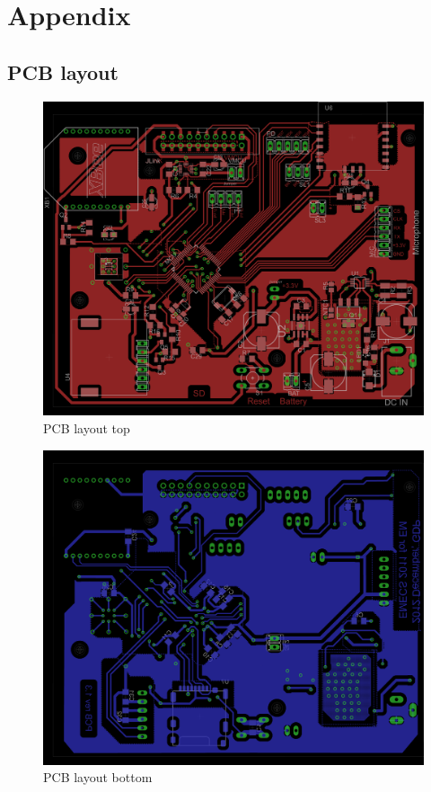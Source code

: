 \chapter{Appendix}

\section{PCB layout}
\begin{figure}[htb]
\includegraphics[width=\columnwidth]{Images/pcb_layout_top}
\caption{PCB layout top}
\label{fig:pcb_layout_top}
\end{figure}

\begin{figure}[htb]
\includegraphics[width=\columnwidth]{Images/pcb_layout_bottom}
\caption{PCB layout bottom}
\label{fig:pcb_layout_bottom}
\end{figure}

